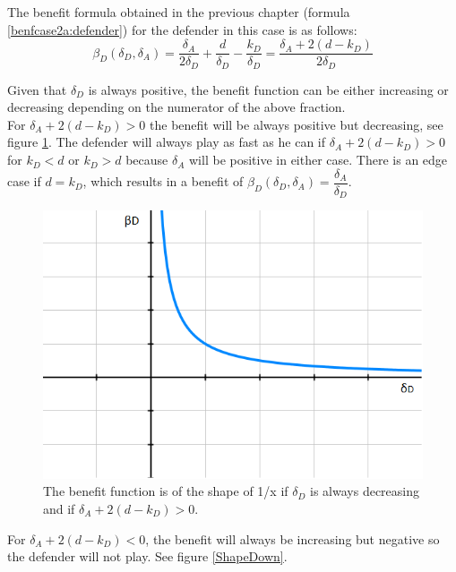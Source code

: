 The benefit formula obtained in the previous chapter (formula \ref{benfcase2a:defender}) for the defender in this case is as follows:
\begin{equation*}
\beta_{D}(\delta_{D},\delta_{A})= \dfrac{\delta_{A}}{2\delta_{D}} + \dfrac{d}{\delta_{D}} - \dfrac{k_{D}}{\delta_{D}} = \dfrac{\delta_{A} + 2 (d-k_{D})}{2\delta_{D}}
\end{equation*}

Given that $\delta_{D}$ is always positive, the benefit function can be either increasing or decreasing depending on the numerator of the above fraction. \\

For $\delta_{A} + 2(d-k_{D}) > 0$ the benefit will be always positive but decreasing, see figure \ref{ShapeUp}. 
The defender will always play as fast as he can if $\delta_{A} + 2(d-k_{D}) > 0$ for $k_{D} < d$ or $k_{D} > d$ because $\delta_{A}$ will be positive in either case. There is an edge case if $d=k_{D}$, which results in a benefit of $\beta_{D}(\delta_{D},\delta_{A})= \dfrac{\delta_{A}}{\delta_{D}}$. \\
\begin{figure}
\centering
\includegraphics[scale=0.5]{Images/ShapesUp.png} 
\caption{The benefit function is of the shape of 1/x if $\delta_{D}$ is always decreasing and if $\delta_{A} + 2(d-k_{D}) > 0$. }
\label{ShapeUp}
\end{figure}

For $\delta_{A} + 2(d-k_{D}) < 0$, the benefit will always be increasing but negative so the defender will not play. See figure \ref{ShapeDown}.  \\

